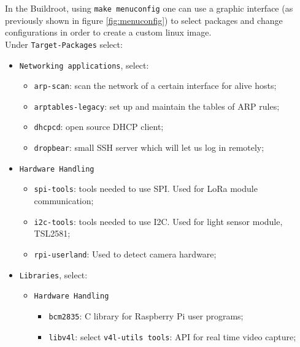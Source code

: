 In the Buildroot, using \verb|make menuconfig| one can use a graphic interface (as previously shown in figure \ref{fig:menuconfig}) to select packages and change configurations in order to create a custom linux image.\\

Under \verb|Target-Packages| select:
\begin{itemize}
	
	\item \verb|Networking applications|, select:
	\begin{itemize}
		\item \verb|arp-scan|: scan the network of a certain interface for alive hosts;
		\item \verb|arptables-legacy|: set up and maintain the tables of ARP rules;
		\item \verb|dhcpcd|: open source DHCP client;
		\item \verb|dropbear|: small SSH server which will let us log in remotely;
	\end{itemize}
	
	\item \verb|Hardware Handling|
	\begin{itemize}
		\item \verb|spi-tools|: tools needed to use SPI. Used for LoRa module communication;
		\item \verb|i2c-tools|: tools needed to use I2C. Used for light sensor module, TSL2581;
		\item \verb|rpi-userland|: Used to detect camera hardware;
	\end{itemize}
	
	\item \verb|Libraries|, select:
	\begin{itemize}
		\item \verb|Hardware Handling|
		\begin{itemize}
			\item \verb|bcm2835|: C library for Raspberry Pi user programs;
			\item \verb|libv4l|: select \verb|v4l-utils tools|: API for real time video capture;
		\end{itemize}
		

\end{itemize}
\end{itemize}
